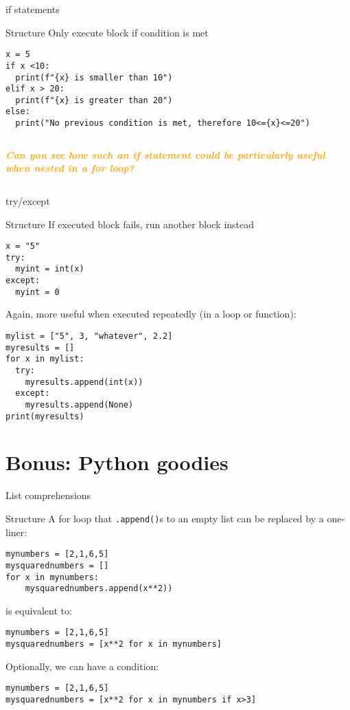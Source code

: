 \documentclass{beamer}
\newcommand{\question}[1]{
	\begin{frame}[plain]
		\begin{columns}
			\column{.3\textwidth}
			\makebox[\columnwidth]{
				\texttt{[image: mannetje.png]}}
			\column{.7\textwidth}
			\large
			\textcolor{orange}{\textbf{\emph{#1}}}
		\end{columns}
\end{frame}}
\begin{document}
\begin{frame}[fragile]{if statements}
\begin{block}{Structure}
	Only execute block if condition is met
\end{block}
\begin{lstlisting}
x = 5
if x <10:
  print(f"{x} is smaller than 10")
elif x > 20:
  print(f"{x} is greater than 20")
else:
  print("No previous condition is met, therefore 10<={x}<=20")
\end{lstlisting}

\end{frame}


\question{Can you see how such an if statement could be particularly useful when nested in a for loop?}



\begin{frame}[fragile]{try/except}
\begin{block}{Structure}
	If executed block fails, run another block instead
\end{block}
\begin{lstlisting}
x = "5"
try: 
  myint = int(x)
except:
  myint = 0
\end{lstlisting}

\pause 
\small{Again, more useful when executed repeatedly (in a loop or function):}
\begin{lstlisting}
mylist = ["5", 3, "whatever", 2.2]
myresults = []
for x in mylist:
  try: 
    myresults.append(int(x))
  except:
    myresults.append(None)
print(myresults)
\end{lstlisting}
\end{frame}





\section{Bonus: Python goodies}

\begin{frame}[fragile]{List comprehensions}
\begin{block}{Structure}
A for loop that \texttt{.append()}s to an empty list can be replaced by a one-liner:
\end{block}
\begin{lstlisting}
mynumbers = [2,1,6,5]
mysquarednumbers = []
for x in mynumbers:
    mysquarednumbers.append(x**2))
\end{lstlisting}
is equivalent to:
\begin{lstlisting}
mynumbers = [2,1,6,5]
mysquarednumbers = [x**2 for x in mynumbers]
\end{lstlisting}

\pause 
Optionally, we can have a condition:
\begin{lstlisting}
mynumbers = [2,1,6,5]
mysquarednumbers = [x**2 for x in mynumbers if x>3]
\end{lstlisting}

\end{frame}
\end{document}
